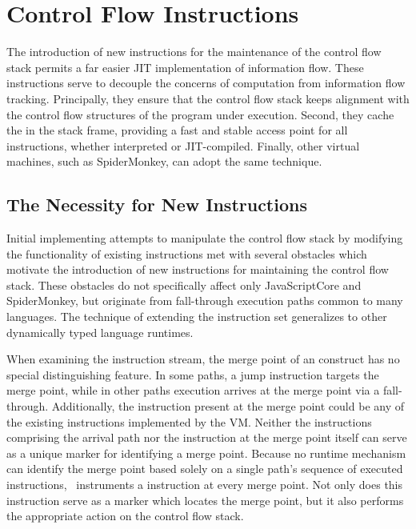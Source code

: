 \section{Control Flow Instructions}\label{ch:implementation-sec:instructions}

The introduction of new instructions for the maintenance of the control flow stack permits a far easier JIT implementation of information flow.
These instructions serve to decouple the concerns of computation from information flow tracking.
Principally, they ensure that the control flow stack keeps alignment with the control flow structures of the program under execution.
Second, they cache the \pclabel in the stack frame, providing a fast and stable access point for all instructions, whether interpreted or JIT-compiled.
Finally, other virtual machines, such as SpiderMonkey, can adopt the same technique.

\subsection{The Necessity for New Instructions}

Initial implementing attempts to manipulate the control flow stack by modifying the functionality of existing instructions met with several obstacles which motivate the introduction of new instructions for maintaining the control flow stack.
These obstacles do not specifically affect only JavaScriptCore and SpiderMonkey, but originate from fall-through execution paths common to many languages.
The technique of extending the instruction set generalizes to other dynamically typed language runtimes.

When examining the instruction stream, the merge point of an  construct has no special distinguishing feature.
In some paths, a jump instruction targets the merge point, while in other paths execution arrives at the merge point via a fall-through.
Additionally, the instruction present at the merge point could be any of the existing instructions implemented by the VM.
Neither the instructions comprising the arrival path nor the instruction at the merge point itself can serve as a unique marker for identifying a merge point.
Because no runtime mechanism can identify the merge point based solely on a single path's sequence of executed instructions, \JitFlow\ instruments a \popj instruction at every merge point.
Not only does this instruction serve as a marker which locates the merge point, but it also performs the appropriate action on the control flow stack.


